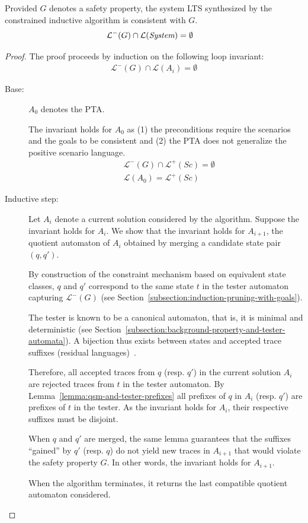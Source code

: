 \begin{theorem}
\label{theorem:system-lts-consistency-with-goals}
Provided $G$ denotes a safety property, the system LTS synthesized by the constrained inductive algorithm is consistent with $G$.
\begin{align*}
&\mathcal{L}^-(G) \cap \mathcal{L}(\emph{System}) = \emptyset
\end{align*}

\begin{proof}
The proof proceeds by induction on the following loop invariant:
\begin{align*}
\mathcal{L}^-(G) \cap \mathcal{L}(A_i) = \emptyset
\end{align*}

\begin{description}
\item[Base:] $A_0$ denotes the PTA.

The invariant holds for $A_0$ as (1) the preconditions require the scenarios and the goals to be consistent and (2) the PTA does not generalize the positive scenario language.
\begin{align*}
&\mathcal{L}^-(G) \cap \mathcal{L}^+(Sc) = \emptyset\\
&\mathcal{L}(A_0) = \mathcal{L}^+(Sc)
\end{align*}

\item[Inductive step:] Let $A_i$ denote a current solution considered by the algorithm. Suppose the invariant holds for $A_i$. We show that the invariant holds for $A_{i+1}$, the quotient automaton of $A_i$ obtained by merging a candidate state pair $(q,q')$.

By construction of the constraint mechanism based on equivalent state classes, $q$ and $q'$ correspond to the same state $t$ in the tester automaton capturing $\mathcal{L}^-(G)$ (see Section~\ref{subsection:induction-pruning-with-goals}).

The tester is known to be a canonical automaton, that is, it is minimal and deterministic (see Section~\ref{subsection:background-property-and-tester-automata}). A bijection thus exists between states and accepted trace suffixes (residual languages)~\cite{Hopcroft:1979}. 

Therefore, all accepted traces from $q$ (resp. $q'$) in the current solution $A_i$ are rejected traces from $t$ in the tester automaton. By Lemma~\ref{lemma:qsm-and-tester-prefixes} all prefixes of $q$ in $A_i$ (resp. $q'$) are prefixes of $t$ in the tester. As the invariant holds for $A_i$, their respective suffixes must be disjoint.

When $q$ and $q'$ are merged, the same lemma guarantees that the suffixes ``gained'' by $q'$ (resp. $q$) do not yield new traces in $A_{i+1}$ that would violate the safety property $G$. In other words, the invariant holds for $A_{i+1}$.

When the algorithm terminates, it returns the last compatible quotient automaton considered.
\end{description}
\end{proof}
\end{theorem}

